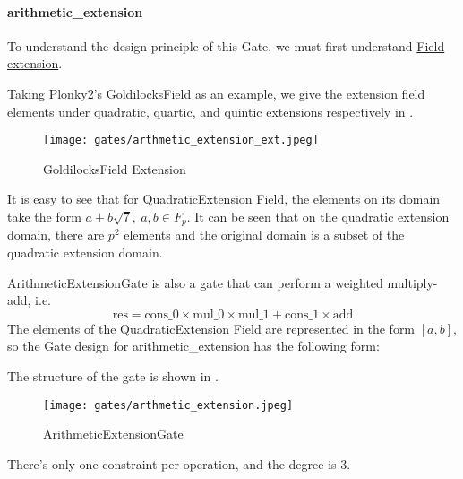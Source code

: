 \paragraph{arithmetic\_extension}

To understand the design principle of this Gate, we must first understand \href{https://en.wikipedia.org/wiki/Field_extension#Extension_field}{Field extension}. 


Taking Plonky2's GoldilocksField as an example, we give the extension field elements under quadratic, quartic, and quintic extensions respectively in .

\begin{figure}[!ht]
    \centering
    \texttt{[image: gates/arthmetic\_extension\_ext.jpeg]}
    \caption{GoldilocksField Extension}
    \label{fig:goldilocksfield-extension}
\end{figure}

It is easy to see that for QuadraticExtension Field, the elements on its domain take the form $a+b\sqrt{7}, \ a,b \in F_p$.
It can be seen that on the quadratic extension domain, there are $p^2$ elements and the original domain is a subset of the quadratic extension domain.

ArithmeticExtensionGate is also a gate that can perform a weighted multiply-add, i.e.
\[ \text{res} = \text{cons\_0} \times \text{mul\_0} \times \text{mul\_1} + \text{cons\_1} \times \text{add} \]
The elements of the QuadraticExtension Field are represented in the form $[a, b]$, so the Gate design for arithmetic\_extension has the following form:

The structure of the gate is shown in .
\begin{figure}[!ht]
    \centering
    \texttt{[image: gates/arthmetic\_extension.jpeg]}
    \caption{ArithmeticExtensionGate}
    \label{fig:arthmetic-extension}
\end{figure}

There's only one constraint per operation, and the degree is 3.
